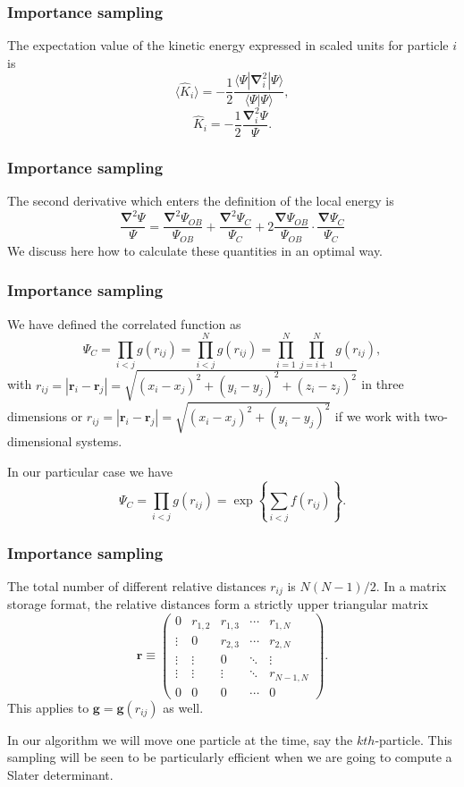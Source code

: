 \documentclass{beamer}
\begin{document}
\begin{frame}
\frametitle{Importance sampling}

The expectation value of the kinetic energy expressed in scaled units  for particle  $i$ is 
\[
 \langle \hat{K}_i \rangle = -\frac{1}{2}\frac{\langle\Psi|\mathbf{\nabla}_{i}^2|\Psi \rangle}{\langle\Psi|\Psi \rangle},
\]
\[
\hat{K}_i = -\frac{1}{2}\frac{\mathbf{\nabla}_{i}^{2} \Psi}{\Psi}.
\]
\end{frame}

\begin{frame}
\frametitle{Importance sampling}

The second derivative which enters the definition of the local energy is 
\[
\frac{\mathbf{\nabla}^2 \Psi}{\Psi}=\frac{\mathbf{\nabla}^2 \Psi_{OB}}{\Psi_{OB}} + \frac{\mathbf{\nabla}^2  \Psi_C}{ \Psi_C} + 2 \frac{\mathbf{\nabla}  \Psi_{OB}}{\Psi_{OB}}\cdot\frac{\mathbf{\nabla}   \Psi_C}{ \Psi_C}
\]
We discuss here how to calculate these quantities in an optimal way.
\end{frame}

\begin{frame}
\frametitle{Importance sampling}

We have defined the correlated function as
\[
\Psi_C=\prod_{i< j}g(r_{ij})=\prod_{i< j}^Ng(r_{ij})= \prod_{i=1}^N\prod_{j=i+1}^Ng(r_{ij}),
\]
with 
$r_{ij}=|\mathbf{r}_i-\mathbf{r}_j|=\sqrt{(x_i-x_j)^2+(y_i-y_j)^2+(z_i-z_j)^2}$ in three dimensions or
$r_{ij}=|\mathbf{r}_i-\mathbf{r}_j|=\sqrt{(x_i-x_j)^2+(y_i-y_j)^2}$ if we work with two-dimensional systems.

In our particular case we have
\[
\Psi_C=\prod_{i< j}g(r_{ij})=\exp{\left\{\sum_{i<j}f(r_{ij})\right\}}.
\]
\end{frame}

\begin{frame}
\frametitle{Importance sampling}

The total number of different relative distances $r_{ij}$ is $N(N-1)/2$. In a matrix storage format, the relative distances  form a strictly upper triangular matrix
\[
 \mathbf{r} \equiv \begin{pmatrix}
  0 & r_{1,2} & r_{1,3} & \cdots & r_{1,N} \\
  \vdots & 0       & r_{2,3} & \cdots & r_{2,N} \\
  \vdots & \vdots  & 0  & \ddots & \vdots  \\
  \vdots & \vdots  & \vdots  & \ddots  & r_{N-1,N} \\
  0 & 0  & 0  & \cdots  & 0
 \end{pmatrix}.
\]
This applies to  $\mathbf{g} = \mathbf{g}(r_{ij})$ as well. 

In our algorithm we will move one particle  at the time, say the $kth$-particle.  This sampling will be seen to be particularly efficient when we are going to compute a Slater determinant.
\end{frame}
\end{document}
